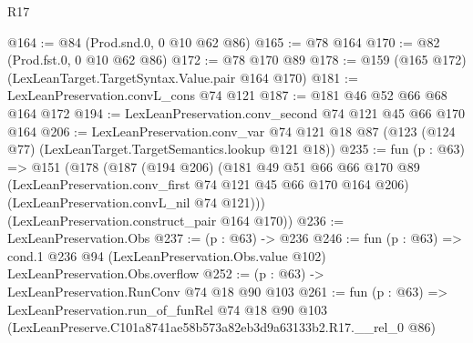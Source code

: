 \begin{lexlean}{R17}
\begin{coremodule}
@164 := @84 (Prod.snd.{0, 0} @10 @62 @86)
@165 := @78 @164
@170 := @82 (Prod.fst.{0, 0} @10 @62 @86)
@172 := @78 @170 @89
@178 := @159 (@165 @172) (LexLeanTarget.TargetSyntax.Value.pair @164 @170)
@181 := LexLeanPreservation.convL_cons @74 @121
@187 := @181 @46 @52 @66 @68 @164 @172
@194 := LexLeanPreservation.conv_second @74 @121 @45 @66 @170 @164
@206 := LexLeanPreservation.conv_var
    @74
    @121
    @18
    @87
    (@123 (@124 @77) (LexLeanTarget.TargetSemantics.lookup @121 @18))
@235 := fun (p : @63) =>
  @151
    (@178
      (@187
        (@194 @206)
        (@181
          @49
          @51
          @66
          @66
          @170
          @89
          (LexLeanPreservation.conv_first @74 @121 @45 @66 @170 @164 @206)
          (LexLeanPreservation.convL_nil @74 @121)))
      (LexLeanPreservation.construct_pair @164 @170))
@236 := LexLeanPreservation.Obs
@237 := (p : @63) -> @236
@246 := fun (p : @63) =>
  cond.{1} @236 @94 (LexLeanPreservation.Obs.value @102) LexLeanPreservation.Obs.overflow
@252 := (p : @63) -> LexLeanPreservation.RunConv @74 @18 @90 @103
@261 := fun (p : @63) =>
  LexLeanPreservation.run_of_funRel
    @74
    @18
    @90
    @103
    (LexLeanPreserve.C101a8741ae58b573a82eb3d9a63133b2.R17.__rel_0 @86)
\end{coremodule}
\end{lexlean}
